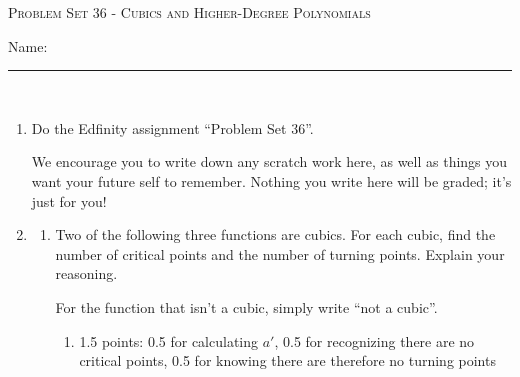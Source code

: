 \documentclass{article}
\newcommand{\doedfinity}[2][\newpage]{
  \begin{problem}[#1]
    Do the Edfinity assignment ``Problem Set #2''.

    We encourage you to write down any scratch work here, as well as
    things you want your future self to remember. Nothing you write
    here will be graded; it's just for you!
  \end{problem}
}
\begin{document}
\begin{center}
  \large\textsc{Problem Set 36 - Cubics and Higher-Degree Polynomials}\vspace{.5in}\\
  \begin{problemonly}
   \large Name: \rule{5cm}{0.15mm}\\
   \end{problemonly}
\end{center}


\begin{enumerate}
\item  {}

  \doedfinity{36}

\item  


  \begin{enumerate}
  \item Two of the following three functions are cubics. For each cubic, find the number of critical points and the number of turning points. Explain your reasoning.

    For the function that isn't a cubic, simply write ``not a cubic''.

    \begin{enumerate}
    \item

      \begin{grading}
        1.5 points: 0.5 for calculating $a'$, 0.5 for recognizing there are no critical points, 0.5 for knowing there are therefore no turning points
      \end{grading}


\end{enumerate}
\end{enumerate}
\end{enumerate}
\end{document}
